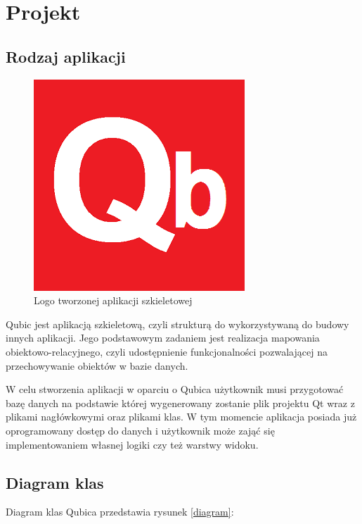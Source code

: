 \documentclass[12pt]{report}
\begin{document}
\section{Projekt}

\subsection{Rodzaj aplikacji}

\begin{figure}[h]
\centering
\includegraphics[width=.55\textwidth]{resources/qb.png}
\caption{Logo tworzonej aplikacji szkieletowej}
\end{figure}

Qubic jest aplikacją szkieletową, czyli strukturą do wykorzystywaną do budowy innych aplikacji. Jego podstawowym zadaniem jest realizacja mapowania obiektowo-relacyjnego,
czyli udostępnienie funkcjonalności pozwalającej na przechowywanie obiektów w bazie danych.

W celu stworzenia aplikacji w oparciu o Qubica użytkownik musi przygotować bazę danych na podstawie której wygenerowany zostanie plik projektu Qt wraz z plikami nagłówkowymi
oraz plikami klas. W tym momencie aplikacja posiada już oprogramowany dostęp do danych i użytkownik może zająć się implementowaniem własnej logiki czy też warstwy widoku.

\subsection{Diagram klas}

Diagram klas Qubica przedstawia rysunek \ref{diagram}:
\end{document}
